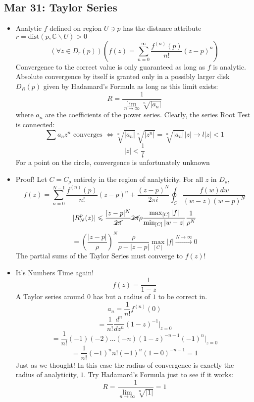 \documentclass[10pt, oneside]{article}
\newcommand{\lti}[1]{\lim_{#1 \rightarrow \infty}}
\let\leq\leqslant
\newcommand{\C}{\mathbb{C}}
\begin{document}
\subsection{Mar 31: Taylor Series}
\begin{itemize}
    \item Analytic $f$ defined on region $U \ni p$ has the distance attribute $r = \text{dist} (p,\C \backslash U) > 0$
            \[(\forall z \in D_r(p))\left( f(z) = \sum_{n=0}^\infty \frac{f^{(n)}(p)}{n!} (z-p)^n \right)\]
        Convergence to the correct value is only guaranteed as long as $f$ is analytic. Absolute convergence by itself is granted only in a possibly larger disk $D_R(p)$ given by Hadamard's Formula as long as this limit exists:
            \[R = \frac{1}{\displaystyle \lti{n} \sqrt[n]{|a_n|}}\]
        where $a_n$ are the coefficients of the power series. Clearly, the series Root Test is connected:
            \[\sum a_n z^n \text{ converges } \Leftrightarrow \sqrt[n]{|a_n|}\sqrt[n]{|z^n|} = \sqrt[n]{|a_n|} |z| \rightarrow l|z| < 1\]
            \[|z| < \frac{1}{l}\]
        For a point on the circle, convergence is unfortunately unknown
    \item Proof! Let $C = C_\rho$ entirely in the region of analyticity. For all $z$ in $D_\rho$,
            \[f(z) = \sum_{n=0}^{N-1} \frac{f^{(n)}(p)}{n!}(z-p)^n + \frac{(z-p)^N}{2\pi i} \oint_C \frac{f(w) dw}{(w-z)(w-p)^N}\]
            \[|R_N^p(z)| \leq \frac{|z-p|^N}{\cancel{2\pi}} \cancel{2\pi}\rho \frac{\max_{[C]} |f|}{\min_{[C]} |w-z|} \frac{1}{\rho^{N}}\]
            \[= \left(\frac{|z-p|}{\rho}\right)^N \frac{\rho}{\rho-|z-p|} \max_{[C]} |f| \overset{N \rightarrow \infty}{\rightarrow} 0\]
        The partial sums of the Taylor Series must converge to $f(z)$!
    \item It's Numbers Time again!
            \[f(z) = \frac{1}{1-z}\]
        A Taylor series around $0$ has but a radius of $1$ to be correct in.
            \[a_n = \frac{1}{n!} f^{(n)}(0)\]
            \[= \frac{1}{n!} \frac{d^n}{dz^n}(1-z)^{-1} |_{z=0}\]
            \[= \frac{1}{n!} (-1)(-2)\hdots(-n)(1-z)^{-n-1}(-1)^n|_{z=0}\]
            \[= \frac{1}{n!} (-1)^n n! (-1)^n (1-0)^{-n-1} = 1\]
        Just as we thought! In this case the radius of convergence is exactly the radius of analyticity, $1$. Try Hadamard's Formula just to see if it works:
            \[R = \frac{1}{\lti{n} \sqrt[n]{|1|}} = 1\]
\end{itemize}
\end{document}
